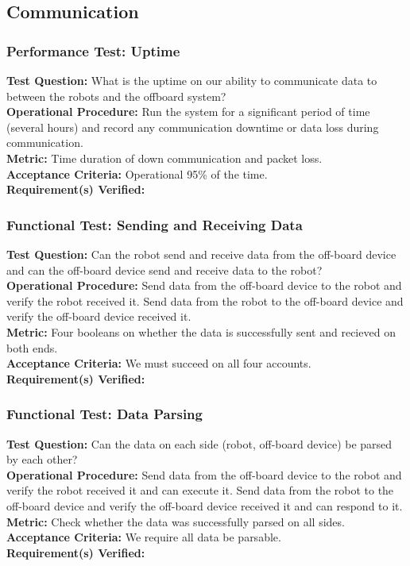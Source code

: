 
\subsection{Communication}
\label{sec:verification_comm}


\subsubsection{Performance Test: Uptime}
\label{sec:comm_pt_reliability}
\textbf{Test Question:} What is the uptime on our ability to communicate data to between the robots and the offboard system?  \\
\textbf{Operational Procedure:} Run the system for a significant period of time (several hours) and record any communication downtime or data loss during communication. \\
\textbf{Metric:} Time duration of down communication and packet loss. \\
\textbf{Acceptance Criteria:} Operational 95\% of the time.\\
\textbf{Requirement(s) Verified:} 

\subsubsection{Functional Test: Sending and Receiving Data}
\label{sec:comm_ft_send}
\textbf{Test Question:} Can the robot send and receive data from the off-board device and can the off-board device send and receive data to the robot?\\
\textbf{Operational Procedure:} Send data from the off-board device to the robot and verify the robot received it. Send data from the robot to the off-board device and verify the off-board device received it. \\
\textbf{Metric:} Four booleans on whether the data is successfully sent and recieved on both ends. \\
\textbf{Acceptance Criteria:} We must succeed on all four accounts. \\
\textbf{Requirement(s) Verified:} 

\subsubsection{Functional Test: Data Parsing}
\label{sec:comm_ft_parse}
\textbf{Test Question:}  Can the data on each side (robot, off-board device) be parsed by each other? \\
\textbf{Operational Procedure:} Send data from the off-board device to the robot and verify the robot received it and can execute it. Send data from the robot to the off-board device and verify the off-board device received it and can respond to it. \\
\textbf{Metric:} Check whether the data was successfully parsed on all sides. \\
\textbf{Acceptance Criteria:} We require all data be parsable. \\
\textbf{Requirement(s) Verified:} 



